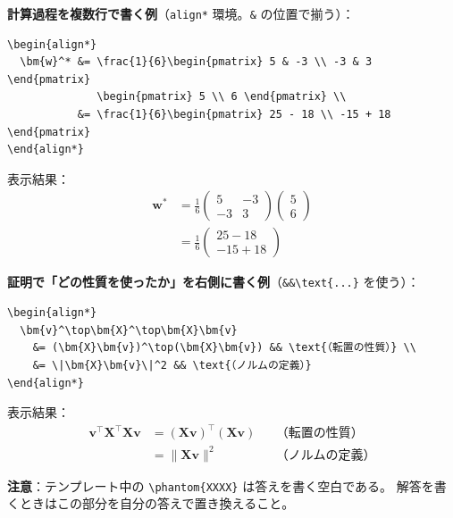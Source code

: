 \documentclass[a4paper,dvipdfmx]{jsarticle}
\newcommand{\提出期限}{2026年10月19日（月）}
\newcommand{\学籍番号}{0000000}
\newcommand{\氏名}{氏名を書く}
\newcommand{\提出日}{2026年10月19日}
\begin{document}
\noindent
\textbf{計算過程を複数行で書く例}（\verb|align*| 環境。\verb|&| の位置で揃う）：
\begin{verbatim}
\begin{align*}
  \bm{w}^* &= \frac{1}{6}\begin{pmatrix} 5 & -3 \\ -3 & 3 \end{pmatrix}
              \begin{pmatrix} 5 \\ 6 \end{pmatrix} \\
           &= \frac{1}{6}\begin{pmatrix} 25 - 18 \\ -15 + 18 \end{pmatrix}
\end{align*}
\end{verbatim}
表示結果：
\begin{align*}
  \bm{w}^* &= \frac{1}{6}\begin{pmatrix} 5 & -3 \\ -3 & 3 \end{pmatrix}
              \begin{pmatrix} 5 \\ 6 \end{pmatrix} \\
           &= \frac{1}{6}\begin{pmatrix} 25 - 18 \\ -15 + 18 \end{pmatrix}
\end{align*}

\noindent
\textbf{証明で「どの性質を使ったか」を右側に書く例}（\verb|&&\text{...}| を使う）：
\begin{verbatim}
\begin{align*}
  \bm{v}^\top\bm{X}^\top\bm{X}\bm{v}
    &= (\bm{X}\bm{v})^\top(\bm{X}\bm{v}) && \text{（転置の性質）} \\
    &= \|\bm{X}\bm{v}\|^2 && \text{（ノルムの定義）}
\end{align*}
\end{verbatim}
表示結果：
\begin{align*}
  \bm{v}^\top\bm{X}^\top\bm{X}\bm{v}
    &= (\bm{X}\bm{v})^\top(\bm{X}\bm{v}) && \text{（転置の性質）} \\
    &= \|\bm{X}\bm{v}\|^2 && \text{（ノルムの定義）}
\end{align*}

\noindent
\textbf{注意}：テンプレート中の \verb|\phantom{XXXX}| は答えを書く空白である。
解答を書くときはこの部分を自分の答えで置き換えること。
\end{document}
